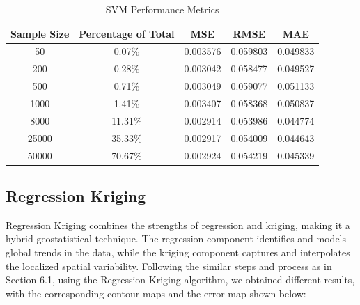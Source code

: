\documentclass{swmcmthesis}
\begin{document}
\begin{table}[h!]
\centering
\caption{SVM Performance Metrics}
\label{tab:metrics_update}
\begin{tabular}{|c|c|c|c|c|}
\hline
\textbf{Sample Size} & \textbf{Percentage of Total} & \textbf{MSE} & \textbf{RMSE} & \textbf{MAE} \\ \hline
50     & 0.07\%  & 0.003576 & 0.059803 & 0.049833 \\ \hline
200    & 0.28\%  & 0.003042 & 0.058477 & 0.049527 \\ \hline
500    & 0.71\%  & 0.003049 & 0.059077 & 0.051133 \\ \hline
1000   & 1.41\%  & 0.003407 & 0.058368 & 0.050837 \\ \hline
8000   & 11.31\% & 0.002914 & 0.053986 & 0.044774 \\ \hline
25000  & 35.33\% & 0.002917 & 0.054009 & 0.044643 \\ \hline
50000  & 70.67\% & 0.002924 & 0.054219 & 0.045339 \\ \hline
\end{tabular}
\end{table}

\subsection{Regression Kriging}

Regression Kriging combines the strengths of regression and kriging, making it a hybrid geostatistical technique. The regression component identifies and models global trends in the data, while the kriging component captures and interpolates the localized spatial variability. Following the similar steps and process as in Section 6.1, using the Regression Kriging algorithm, we obtained different results, with the corresponding contour maps and the error map shown below:
\end{document}
